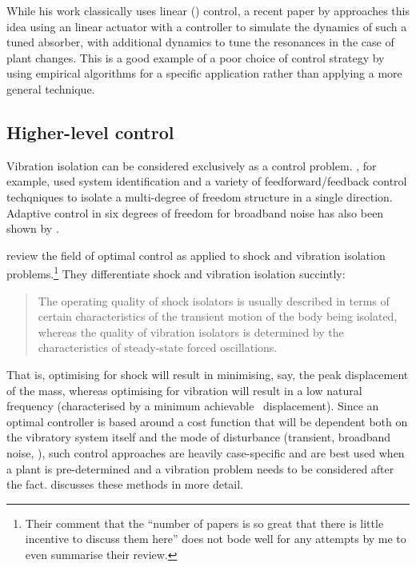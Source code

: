 While his work classically uses linear (\PID) control, a recent paper
by \textcite{wu2007} approaches this idea using an linear actuator
with a controller to simulate the dynamics of such a tuned absorber,
with additional dynamics to tune the resonances in the case of plant
changes. This is a good example of a poor choice of control strategy
by using empirical algorithms for a specific application rather than
applying a more general technique. 



\subsection{Higher-level control}

Vibration isolation can be considered exclusively as a control
problem. \textcite{guo2005}, for example, used system identification
and a variety of feedforward/feedback control techqniques to isolate a
multi-degree of freedom structure in a single direction. Adaptive
control in six degrees of freedom for broadband noise has also been
shown by \textcite{duindam2005}.

\textcite{balandin1998} review the field of optimal control as applied
to shock and vibration isolation problems.\footnote{Their comment that the
  \enquote{number of papers is so great that there is little incentive to
  discuss them here} does not bode well for any attempts by me to
  even summarise their review.} 
  They differentiate shock and vibration isolation succintly:
\begin{quote}
  The operating quality of shock isolators is usually described in
  terms of certain characteristics of the transient motion of the body
  being isolated, whereas the quality of vibration isolators is
  determined by the characteristics of steady-state forced
  oscillations.
\end{quote}
That is, optimising for shock will result in minimising, say, the peak
displacement of the mass, whereas optimising for vibration will result
in a low natural frequency (characterised by a minimum achievable
\RMS\ displacement). Since an optimal controller is based around a
cost function that will be dependent both on the vibratory system
itself and the mode of disturbance (transient, broadband noise, \etc),
such control approaches are heavily case-specific and are best used
when a plant is pre-determined and a vibration problem needs to be
considered after the fact. \textcite{bolotnik2001} discusses these
methods in more detail.

